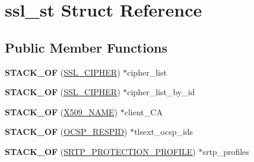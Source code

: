 \hypertarget{structssl__st}{}\section{ssl\+\_\+st Struct Reference}
\label{structssl__st}
\subsection*{Public Member Functions}
\begin{DoxyCompactItemize}
\item 
\mbox{\label{structssl__st_ab6c66fd31facb850ca3489e8b6662fc5}} 
{\bfseries S\+T\+A\+C\+K\+\_\+\+OF} (\hyperlink{structssl__cipher__st}{S\+S\+L\+\_\+\+C\+I\+P\+H\+ER}) $\ast$cipher\+\_\+list
\item 
\mbox{\label{structssl__st_a2bc578cfbd4fd422970e4a9b1a92a207}} 
{\bfseries S\+T\+A\+C\+K\+\_\+\+OF} (\hyperlink{structssl__cipher__st}{S\+S\+L\+\_\+\+C\+I\+P\+H\+ER}) $\ast$cipher\+\_\+list\+\_\+by\+\_\+id
\item 
\mbox{\label{structssl__st_a6951f8f6d0c8db4ff06352aaaa930a73}} 
{\bfseries S\+T\+A\+C\+K\+\_\+\+OF} (\hyperlink{struct_x509__name__st}{X509\+\_\+\+N\+A\+ME}) $\ast$client\+\_\+\+CA
\item 
\mbox{\label{structssl__st_af4fc0dee1ca3a84a8715babe6b80731e}} 
{\bfseries S\+T\+A\+C\+K\+\_\+\+OF} (\hyperlink{structocsp__responder__id__st}{O\+C\+S\+P\+\_\+\+R\+E\+S\+P\+ID}) $\ast$tlsext\+\_\+ocsp\+\_\+ids
\item 
\mbox{\label{structssl__st_a329c95fa618975c16e2b4c8cab8a83b2}} 
{\bfseries S\+T\+A\+C\+K\+\_\+\+OF} (\hyperlink{structsrtp__protection__profile__st}{S\+R\+T\+P\+\_\+\+P\+R\+O\+T\+E\+C\+T\+I\+O\+N\+\_\+\+P\+R\+O\+F\+I\+LE}) $\ast$srtp\+\_\+profiles
\end{DoxyCompactItemize}
